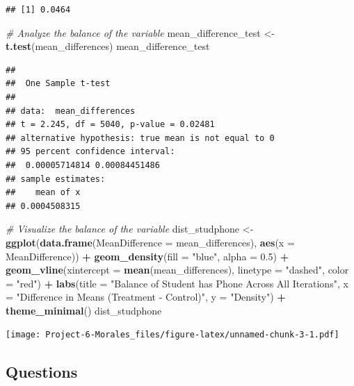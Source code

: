 \documentclass[
]{article}
\newenvironment{Shaded}{\begin{snugshade}}{\end{snugshade}}
\newcommand{\AttributeTok}[1]{\textcolor[rgb]{0.13,0.29,0.53}{#1}}
\newcommand{\CommentTok}[1]{\textcolor[rgb]{0.56,0.35,0.01}{\textit{#1}}}
\newcommand{\FloatTok}[1]{\textcolor[rgb]{0.00,0.00,0.81}{#1}}
\newcommand{\FunctionTok}[1]{\textcolor[rgb]{0.13,0.29,0.53}{\textbf{#1}}}
\newcommand{\NormalTok}[1]{#1}
\newcommand{\OtherTok}[1]{\textcolor[rgb]{0.56,0.35,0.01}{#1}}
\newcommand{\SpecialCharTok}[1]{\textcolor[rgb]{0.81,0.36,0.00}{\textbf{#1}}}
\newcommand{\StringTok}[1]{\textcolor[rgb]{0.31,0.60,0.02}{#1}}
\begin{document}
\begin{verbatim}
## [1] 0.0464
\end{verbatim}

\begin{Shaded}
\begin{Highlighting}[]
\CommentTok{\# Analyze the balance of the variable}
\NormalTok{mean\_difference\_test }\OtherTok{\textless{}{-}} \FunctionTok{t.test}\NormalTok{(mean\_differences)}
\NormalTok{mean\_difference\_test}
\end{Highlighting}
\end{Shaded}

\begin{verbatim}
## 
##  One Sample t-test
## 
## data:  mean_differences
## t = 2.245, df = 5040, p-value = 0.02481
## alternative hypothesis: true mean is not equal to 0
## 95 percent confidence interval:
##  0.00005714814 0.00084451486
## sample estimates:
##    mean of x 
## 0.0004508315
\end{verbatim}

\begin{Shaded}
\begin{Highlighting}[]
\CommentTok{\# Visualize the balance of the variable}
\NormalTok{dist\_studphone }\OtherTok{\textless{}{-}} \FunctionTok{ggplot}\NormalTok{(}\FunctionTok{data.frame}\NormalTok{(}\AttributeTok{MeanDifference =}\NormalTok{ mean\_differences), }\FunctionTok{aes}\NormalTok{(}\AttributeTok{x =}\NormalTok{ MeanDifference)) }\SpecialCharTok{+}
  \FunctionTok{geom\_density}\NormalTok{(}\AttributeTok{fill =} \StringTok{"blue"}\NormalTok{, }\AttributeTok{alpha =} \FloatTok{0.5}\NormalTok{) }\SpecialCharTok{+}
  \FunctionTok{geom\_vline}\NormalTok{(}\AttributeTok{xintercept =} \FunctionTok{mean}\NormalTok{(mean\_differences), }\AttributeTok{linetype =} \StringTok{"dashed"}\NormalTok{, }\AttributeTok{color =} \StringTok{"red"}\NormalTok{) }\SpecialCharTok{+}
  \FunctionTok{labs}\NormalTok{(}\AttributeTok{title =} \StringTok{"Balance of Student has Phone Across All Iterations"}\NormalTok{,}
       \AttributeTok{x =} \StringTok{"Difference in Means (Treatment {-} Control)"}\NormalTok{,}
       \AttributeTok{y =} \StringTok{"Density"}\NormalTok{) }\SpecialCharTok{+}
  \FunctionTok{theme\_minimal}\NormalTok{()}
\NormalTok{dist\_studphone}
\end{Highlighting}
\end{Shaded}

\texttt{[image: Project-6-Morales\_files/figure-latex/unnamed-chunk-3-1.pdf]}

\hypertarget{questions}{%
\subsection{Questions}\label{questions}}
\end{document}
